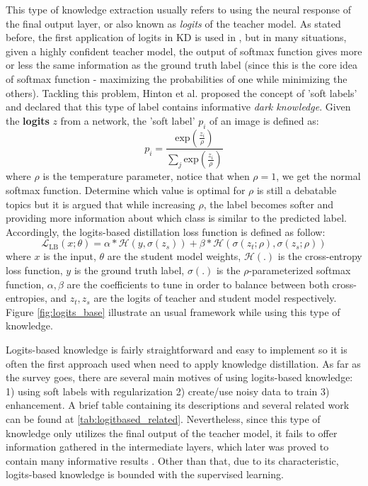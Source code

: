 This type of knowledge extraction usually refers to using the neural response of the final output layer, or also known as \textit{logits} of the teacher model. As stated before, the first application of logits in KD is used in \cite{firstkdpaper}, but in many situations, given a highly confident teacher model, the output of softmax function gives more or less the same information as the ground truth label (since this is the core idea of softmax function - maximizing the probabilities of one while minimizing the others). Tackling this problem, Hinton et al. \cite{hintonfirstkd} proposed the concept of 'soft labels' and declared that this type of label contains informative \textit{dark knowledge}. Given the \textbf{logits} $z$ from a network, the 'soft label' $p_i$ of an image is defined as:
\[
   p_i = \frac{\text{exp}(\frac{z_i}{\rho})}{\sum_j \text{exp}(\frac{z_i}{\rho})}
\]
where $\rho$ is the temperature parameter, notice that when $\rho=1$, we get the normal softmax function. Determine which value is optimal for $\rho$ is still a debatable topics but it is argued that while increasing $\rho$, the label becomes softer and providing more information about which class is similar to the predicted label. Accordingly, the logits-based distillation loss function is defined as follow:
\[
   \mathcal{L}_{\text{LB}}(x;\theta) = \alpha * \mathcal{H}(y, \sigma(z_s)) + \beta * \mathcal{H}(\sigma(z_t;\rho), \sigma(z_s;\rho))
\]
where $x$ is the input, $\theta$ are the student model weights, $\mathcal{H}(.)$ is the cross-entropy loss function, $y$ is the ground truth label, $\sigma(.)$ is the $\rho$-parameterized softmax function, $\alpha, \beta$ are the coefficients to tune in order to balance between both cross-entropies, and $z_t, z_s$ are the logits of teacher and student model respectively. Figure \ref{fig:logits_base} illustrate an usual framework while using this type of knowledge.

Logits-based knowledge is fairly straightforward and easy to implement so it is often the first approach used when need to apply knowledge distillation. As far as the survey goes, there are several main motives of using logits-based knowledge: 1) using soft labels with regularization 2) create/use noisy data to train 3) enhancement. A brief table containing its descriptions and several related work can be found at \ref{tab:logitbased_related}. Nevertheless, since this type of knowledge only utilizes the final output of the teacher model, it fails to offer information gathered in the intermediate layers, which later was proved to contain many informative results \cite{featurebased01}. Other than that, due to its characteristic, logits-based knowledge is bounded with the supervised learning.


